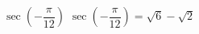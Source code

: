 {$\sec \left( -\dfrac{\pi}{12} \right)$}
{$\sec \left( -\dfrac{\pi}{12} \right) = \sqrt{6} - \sqrt{2}$}
